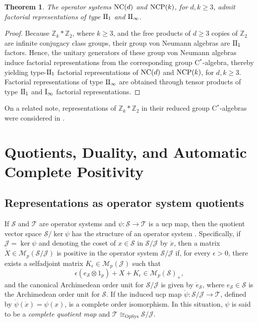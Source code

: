 \documentclass{amsart}
\newtheorem{theorem}{Theorem}[section]
\theoremstyle{definition}
\theoremstyle{remark}
\newcommand{\M}{\mathcal{M}}
\newcommand\oss{{\mathcal S}}
\newcommand\ost{{\mathcal T}}
\newcommand{\jay}{\mathcal{J}}                   %
\numberwithin{equation}{section}
\begin{document}
\begin{theorem}
The operator systems $\mbox{\textrm{NC}}(d)$ and $\mbox{\textrm{NCP}}(k)$, for $d,k\geq3$, admit factorial representations of type $\mbox{\textrm II}_1$
and $\mbox{\textrm II}_\infty$.
\end{theorem}

\begin{proof} Because $\mathbb Z_k*\mathbb Z_2$, where $k\geq3$, and the free products of $d\geq3$ copies of $\mathbb Z_2$
are infinite conjugacy class groups, their group von Neumann algebras are 
$\mbox{\textrm II}_1$ factors. Hence, the unitary generators of these
group von Neumann algebras induce factorial representations from the corresponding group C$^*$-algebra, thereby yielding type-$\mbox{\textrm II}_1$
factorial representations of $\mbox{\textrm{NC}}(d)$ and $\mbox{\textrm{NCP}}(k)$, for $d,k\geq3$. Factorial representations of type $\mbox{\textrm II}_\infty$
are obtained through tensor products of type $\mbox{\textrm II}_1$ and $\mbox{\textrm I}_\infty$ factorial representations.
\end{proof}

On a related note, representations of $\mathbb Z_k* \mathbb Z_2$ in their
reduced group C$^*$-algebras were considered in \cite{paschke--salinas1979}.

\section{Quotients, Duality, and Automatic Complete Positivity}

\subsection{Representations as operator system quotients}

If $\oss$ and $\ost$ are operator systems and $\psi:\oss\rightarrow\ost$ is a ucp map, then the quotient vector space
$\oss/\ker\psi$ has the structure of an operator system \cite{kavruk--paulsen--todorov--tomforde2013}. Specifically, if $\jay=\ker\psi$
and denoting the coset of $x\in\oss$ in $\oss/\jay$ by $\dot{x}$, then 
a matrix $\dot{X}\in \M_p(\oss/\jay)$ is positive in the operator system $\oss/\jay$ if, for every $\epsilon>0$, there exists a selfadjoint
matrix $K_\epsilon\in \M_p(\jay)$ such that 
\[
\epsilon (e_\oss\otimes 1_p) + X+K_\epsilon \in \M_p(\oss)_+,
\]
and the canonical Archimedean order unit for $\oss/\jay$ is given by $\dot{e}_\oss$, where $e_\oss\in\oss$ is the Archimedean order unit for $\oss$.
If the induced ucp map 
 $\dot{\psi}:\oss/\jay\rightarrow\ost$, defined by $\dot{\psi}(\dot{x})=\psi(x)$, is a complete order isomorphism.
In this situation, $\psi$ is said to be a \emph{complete quotient map} and $\ost\cong_{\textrm{OpSys}}\oss/\jay$.
\end{document}
